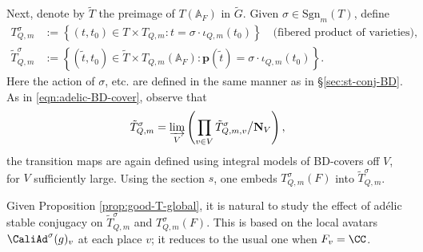\documentclass[a4paper,10pt]{article}
\begin{document}
Next, denote by $\tilde{T}$ the preimage of $T(\mathbb{A}_F)$ in $\tilde{G}$. Given $\sigma \in \text{Sgn}_m(T)$, define
\begin{align*}
	T^\sigma_{Q,m} & := \left\{ (t, t_0) \in T \times T_{Q,m}: t = \sigma \cdot \iota_{Q,m}(t_0) \right\} \quad \text{(fibered product of varieties)}, \\
	\tilde{T}^\sigma_{Q,m} & := \left\{ (\tilde{t}, t_0) \in \tilde{T} \times T_{Q,m}(\mathbb{A}_F): \bm{p}(\tilde{t}) = \sigma \cdot \iota_{Q,m}(t_0) \right\}.
\end{align*}
Here the action of $\sigma$, etc. are defined in the same manner as in \S\ref{sec:st-conj-BD}. As in \eqref{eqn:adelic-BD-cover}, observe that
\[ \tilde{T}^\sigma_{Q,m} = \varinjlim_V \left( \prod_{v \in V} \tilde{T}^\sigma_{Q,m,v} \big/ \mathbf{N}_V \right), \]
the transition maps are again defined using integral models of BD-covers off $V$, for $V$ sufficiently large. Using the section $s$, one embeds $T^\sigma_{Q,m}(F)$ into $\tilde{T}^\sigma_{Q,m}$.

Given Proposition \ref{prop:good-T-global}, it is natural to study the effect of adélic stable conjugacy on $\tilde{T}^\sigma_{Q,m}$ and $T^\sigma_{Q,m}(F)$. This is based on the local avatars $\CaliAd^\sigma(g)_v$ at each place $v$; it reduces to the usual one when $F_v = \CC$.
\end{document}
